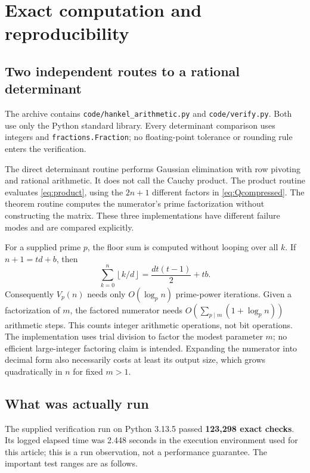 \documentclass[11pt,a4paper]{article}
\numberwithin{equation}{section}
\theoremstyle{definition}
\theoremstyle{remark}
\newcommand{\floor}[1]{\left\lfloor#1\right\rfloor}
\begin{document}
\section{Exact computation and reproducibility}\label{sec:computation}

\subsection{Two independent routes to a rational determinant}
The archive contains \texttt{code/hankel\_arithmetic.py} and \texttt{code/verify.py}. Both use only the Python standard library. Every determinant comparison uses integers and \texttt{fractions.Fraction}; no floating-point tolerance or rounding rule enters the verification.

The direct determinant routine performs Gaussian elimination with row pivoting and rational arithmetic. It does not call the Cauchy product. The product routine evaluates \eqref{eq:product}, using the $2n+1$ different factors in \eqref{eq:Qcompressed}. The theorem routine computes the numerator's prime factorization without constructing the matrix. These three implementations have different failure modes and are compared explicitly.

For a supplied prime $p$, the floor sum is computed without looping over all $k$. If $n+1=td+b$, then
\[
 \sum_{k=0}^n\floor{k/d}=\frac{dt(t-1)}2+tb.
\]
Consequently $V_p(n)$ needs only $O(\log_p n)$ prime-power iterations. Given a factorization of $m$, the factored numerator needs
$O(\sum_{p\mid m}(1+\log_p n))$ arithmetic steps. This counts integer arithmetic operations, not bit operations. The implementation uses trial division to factor the modest parameter $m$; no efficient large-integer factoring claim is intended. Expanding the numerator into decimal form also necessarily costs at least its output size, which grows quadratically in $n$ for fixed $m>1$.

\subsection{What was actually run}
The supplied verification run on Python 3.13.5 passed \textbf{123,298 exact checks}. Its logged elapsed time was 2.448 seconds in the execution environment used for this article; this is a run observation, not a performance guarantee. The important test ranges are as follows.
\end{document}
